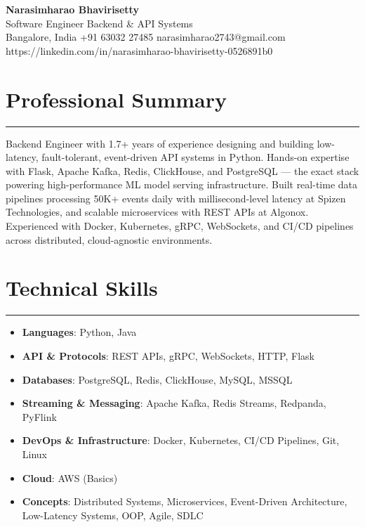 \documentclass[10pt]{article}
\begin{document}
\begin{center}
  {\huge\textbf{Narasimharao Bhavirisetty}}\\[3pt]
  Software Engineer \textbullet{} Backend \& API Systems \\[3pt]
  Bangalore, India \textbullet{} +91 63032 27485 \textbullet{} narasimharao2743@gmail.com \textbullet{} https://linkedin.com/in/narasimharao-bhavirisetty-0526891b0
\end{center}

\vspace{4pt}

\section*{Professional Summary}
\vspace{1pt}\hrule\vspace{4pt}
Backend Engineer with 1.7+ years of experience designing and building low-latency, fault-tolerant, event-driven API systems in Python. Hands-on expertise with Flask, Apache Kafka, Redis, ClickHouse, and PostgreSQL — the exact stack powering high-performance ML model serving infrastructure. Built real-time data pipelines processing 50K+ events daily with millisecond-level latency at Spizen Technologies, and scalable microservices with REST APIs at Algonox. Experienced with Docker, Kubernetes, gRPC, WebSockets, and CI/CD pipelines across distributed, cloud-agnostic environments.

\section*{Technical Skills}
\vspace{1pt}\hrule\vspace{4pt}
\begin{itemize}
  \item \textbf{Languages}: Python, Java
  \item \textbf{API \& Protocols}: REST APIs, gRPC, WebSockets, HTTP, Flask
  \item \textbf{Databases}: PostgreSQL, Redis, ClickHouse, MySQL, MSSQL
  \item \textbf{Streaming \& Messaging}: Apache Kafka, Redis Streams, Redpanda, PyFlink
  \item \textbf{DevOps \& Infrastructure}: Docker, Kubernetes, CI/CD Pipelines, Git, Linux
  \item \textbf{Cloud}: AWS (Basics)
  \item \textbf{Concepts}: Distributed Systems, Microservices, Event-Driven Architecture, Low-Latency Systems, OOP, Agile, SDLC
\end{itemize}
\end{document}
